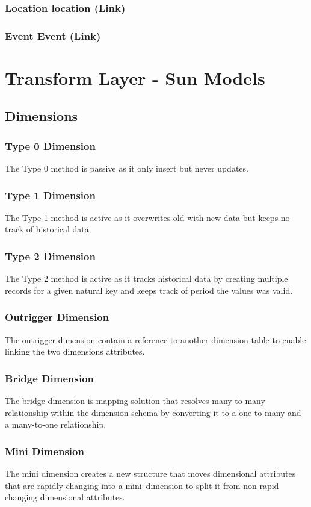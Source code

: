 \documentclass{acm_proc_article-sp}
\begin{document}
\subsubsection{Location location (Link)}
\subsubsection{Event Event (Link)}
\pagebreak
\section{Transform Layer - Sun Models}
\subsection{Dimensions}
\subsubsection{Type 0 Dimension}
The Type 0 method is passive as it only insert but never updates.
\subsubsection{Type 1 Dimension}
The Type 1 method is active as it overwrites old with new data but keeps no track of historical data.
\subsubsection{Type 2 Dimension}
The Type 2 method is active as it tracks historical data by creating multiple records for a given natural key and keeps track of period the values was valid.
\subsubsection{Outrigger Dimension}
The outrigger dimension contain a reference to another dimension table to enable linking the two dimensions attributes.
\subsubsection{Bridge Dimension}
The bridge dimension is mapping solution that resolves many-to-many relationship within the dimension schema by converting it to a one-to-many and a many-to-one relationship. 
\subsubsection{Mini Dimension}
The mini dimension creates a new structure that moves dimensional attributes that are rapidly changing into a mini–dimension to split it from non-rapid changing dimensional attributes.
\end{document}
